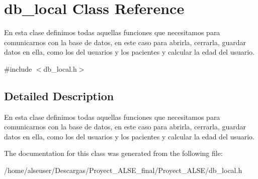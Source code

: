 \hypertarget{classdb__local}{}\section{db\+\_\+local Class Reference}
\label{classdb__local}


En esta clase definimos todas aquellas funciones que necesitamos para comunicarnos con la base de datos, en este caso para abrirla, cerrarla, guardar datos en ella, como los del usuarios y los pacientes y calcular la edad del usuario.  




{\ttfamily \#include $<$db\+\_\+local.\+h$>$}



\subsection{Detailed Description}
En esta clase definimos todas aquellas funciones que necesitamos para comunicarnos con la base de datos, en este caso para abrirla, cerrarla, guardar datos en ella, como los del usuarios y los pacientes y calcular la edad del usuario. 

The documentation for this class was generated from the following file\+:\begin{DoxyCompactItemize}
\item 
/home/alseuser/\+Descargas/\+Proyect\+\_\+\+A\+L\+S\+E\+\_\+final/\+Proyect\+\_\+\+A\+L\+S\+E/db\+\_\+local.\+h\end{DoxyCompactItemize}
